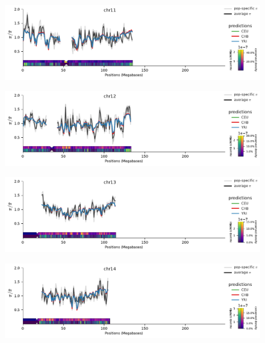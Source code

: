 \documentclass[11pt]{article}
\begin{document}
\begin{figure}[!htb]
  \centering
  \includegraphics[width=\textwidth]{figures/supplementary/pred_plot_chr11.pdf}
  \label{suppfig:fit-chr11}
\end{figure}


\begin{figure}[!htb]
  \centering
  \includegraphics[width=\textwidth]{figures/supplementary/pred_plot_chr12.pdf}
  \label{suppfig:fit-chr12}
\end{figure}


\begin{figure}[!htb]
  \centering
  \includegraphics[width=\textwidth]{figures/supplementary/pred_plot_chr13.pdf}
  \label{suppfig:fit-chr13}
\end{figure}


\begin{figure}[!htb]
  \centering
  \includegraphics[width=\textwidth]{figures/supplementary/pred_plot_chr14.pdf}
  \label{suppfig:fit-chr14}
\end{figure}
\end{document}
